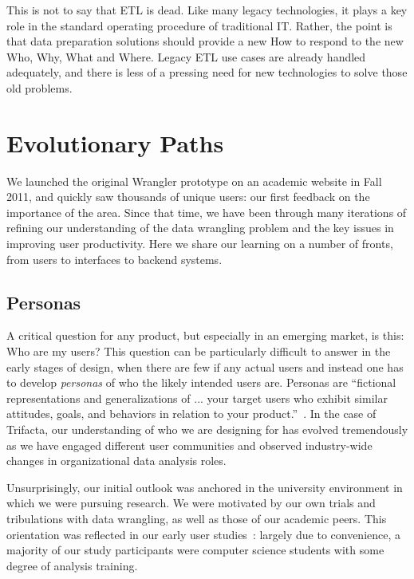 \documentclass[11pt]{article}
\begin{document}
This is not to say that ETL is dead. Like many legacy technologies, it plays a key role in the standard operating procedure of traditional IT. Rather, the point is that data preparation solutions should provide a new How to respond to the new Who, Why, What and Where. Legacy ETL use cases are already handled adequately, and there is less of a pressing need for new technologies to solve those old problems.



\section{Evolutionary Paths}
We launched the original Wrangler prototype on an academic website in Fall 2011, and quickly saw thousands of unique users: our first feedback on the importance of the area.
Since that time, we have been through many iterations of refining our understanding of the data wrangling problem and the key issues in improving user productivity. Here we share our learning on a number of fronts, from users to interfaces to backend systems.

\subsection{Personas}
A critical question for any product, but especially in an emerging market, is this: Who are my users? This question can be particularly difficult to answer in the early stages of design, when there are few if any actual users and instead one has to develop \emph{personas} of who the likely intended users are. Personas are ``fictional representations and generalizations of ... your target users who exhibit similar attitudes, goals, and behaviors in relation to your product.''~\cite{personas}. In the case of Trifacta, our understanding of who we are designing for has evolved tremendously as we have engaged different user communities and observed industry-wide changes in organizational data analysis roles.

Unsurprisingly, our initial outlook was anchored in the university environment in which we were pursuing research. We were motivated by our own trials and tribulations with data wrangling, as well as those of our academic peers. This orientation was reflected in our early user studies~\cite{wrangler, proactive-wrangler}: largely due to convenience, a majority of our study participants were computer science students with some degree of analysis training.
\end{document}
